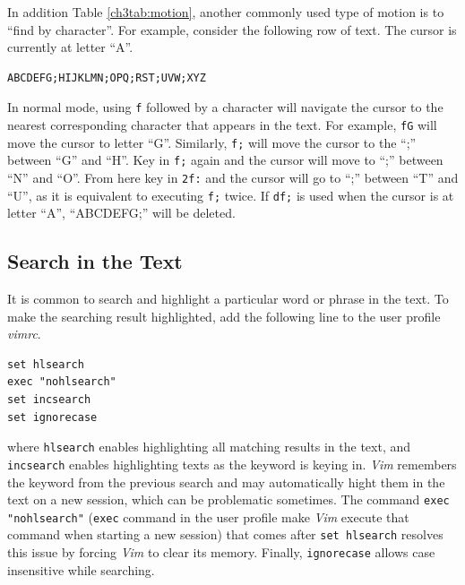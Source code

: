 In addition Table \ref{ch3tab:motion}, another commonly used type of motion is to ``find by character''. For example, consider the following row of text. The cursor is currently at letter ``A''.
\begin{lstlisting}
ABCDEFG;HIJKLMN;OPQ;RST;UVW;XYZ
\end{lstlisting}
In normal mode, using \verb|f| followed by a character will navigate the cursor to the nearest corresponding character that appears in the text. For example, \verb|fG| will move the cursor to letter ``G''. Similarly, \verb|f;| will move the cursor to the ``;'' between ``G'' and ``H''. Key in \verb|f;| again and the cursor will move to ``;'' between ``N'' and ``O''. From here key in \verb|2f:| and the cursor will go to ``;'' between ``T'' and ``U'', as it is equivalent to executing \verb|f;| twice. If \verb|df;| is used when the cursor is at letter ``A'', ``ABCDEFG;'' will be deleted.

\subsection{Search in the Text}

It is common to search and highlight a particular word or phrase in the text. To make the searching result highlighted, add the following line to the user profile \textit{vimrc}.
\begin{lstlisting}
set hlsearch
exec "nohlsearch"
set incsearch
set ignorecase
\end{lstlisting}
where \verb|hlsearch| enables highlighting all matching results in the text, and \verb|incsearch| enables highlighting texts as the keyword is keying in. \textit{Vim} remembers the keyword from the previous search and may automatically hight them in the text on a new session, which can be problematic sometimes. The command \verb|exec "nohlsearch"| (\verb|exec| command in the user profile make \textit{Vim} execute that command when starting a new session) that comes after \verb|set hlsearch| resolves this issue by forcing \textit{Vim} to clear its memory. Finally, \verb|ignorecase| allows case insensitive while searching.

